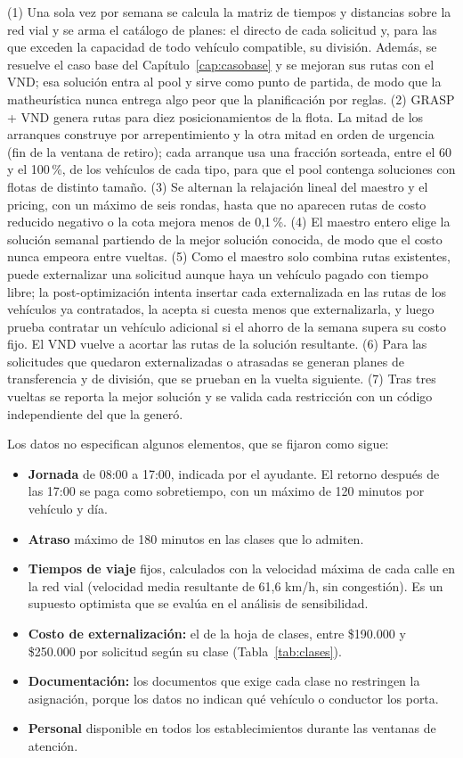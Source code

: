  (1) Una sola vez por semana se calcula la matriz de tiempos y distancias sobre la red vial y se arma el catálogo de planes: el directo de cada solicitud y, para las que exceden la capacidad de todo vehículo compatible, su división. Además, se resuelve el caso base del Capítulo~\ref{cap:casobase} y se mejoran sus rutas con el VND; esa solución entra al pool y sirve como punto de partida, de modo que la matheurística nunca entrega algo peor que la planificación por reglas. (2) GRASP + VND genera rutas para diez posicionamientos de la flota. La mitad de los arranques construye por arrepentimiento y la otra mitad en orden de urgencia (fin de la ventana de retiro); cada arranque usa una fracción sorteada, entre el 60 y el 100\,\%, de los vehículos de cada tipo, para que el pool contenga soluciones con flotas de distinto tamaño. (3) Se alternan la relajación lineal del maestro y el pricing, con un máximo de seis rondas, hasta que no aparecen rutas de costo reducido negativo o la cota mejora menos de 0,1\,\%. (4) El maestro entero elige la solución semanal partiendo de la mejor solución conocida, de modo que el costo nunca empeora entre vueltas. (5) Como el maestro solo combina rutas existentes, puede externalizar una solicitud aunque haya un vehículo pagado con tiempo libre; la post-optimización intenta insertar cada externalizada en las rutas de los vehículos ya contratados, la acepta si cuesta menos que externalizarla, y luego prueba contratar un vehículo adicional si el ahorro de la semana supera su costo fijo. El VND vuelve a acortar las rutas de la solución resultante. (6) Para las solicitudes que quedaron externalizadas o atrasadas se generan planes de transferencia y de división, que se prueban en la vuelta siguiente. (7) Tras tres vueltas se reporta la mejor solución y se valida cada restricción con un código independiente del que la generó.

 Los datos no especifican algunos elementos, que se fijaron como sigue:
\begin{itemize}\itemsep0pt
\item \textbf{Jornada} de 08:00 a 17:00, indicada por el ayudante. El retorno después de las 17:00 se paga como sobretiempo, con un máximo de 120 minutos por vehículo y día.
\item \textbf{Atraso} máximo de 180 minutos en las clases que lo admiten.
\item \textbf{Tiempos de viaje} fijos, calculados con la velocidad máxima de cada calle en la red vial (velocidad media resultante de 61,6 km/h, sin congestión). Es un supuesto optimista que se evalúa en el análisis de sensibilidad.
\item \textbf{Costo de externalización:} el de la hoja de clases, entre \$190.000 y \$250.000 por solicitud según su clase (Tabla~\ref{tab:clases}).
\item \textbf{Documentación:} los documentos que exige cada clase no restringen la asignación, porque los datos no indican qué vehículo o conductor los porta.
\item \textbf{Personal} disponible en todos los establecimientos durante las ventanas de atención.
\end{itemize}
